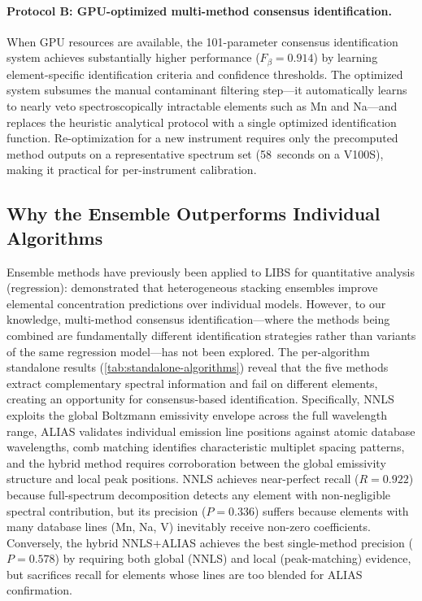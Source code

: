 \paragraph{Protocol B: GPU-optimized multi-method consensus identification.}
When GPU resources are available, the 101-parameter consensus identification system achieves substantially higher performance ($F_{\beta} = 0.914$) by learning element-specific identification criteria and confidence thresholds.
The optimized system subsumes the manual contaminant filtering step---it automatically learns to nearly veto spectroscopically intractable elements such as Mn and Na---and replaces the heuristic analytical protocol with a single optimized identification function.
Re-optimization for a new instrument requires only the precomputed method outputs on a representative spectrum set (58~seconds on a V100S), making it practical for per-instrument calibration.

\subsection{Why the Ensemble Outperforms Individual Algorithms}

Ensemble methods have previously been applied to LIBS for quantitative analysis (regression): \citet{Zeng2020} demonstrated that heterogeneous stacking ensembles improve elemental concentration predictions over individual models.
However, to our knowledge, multi-method consensus identification---where the methods being combined are fundamentally different identification strategies rather than variants of the same regression model---has not been explored.
The per-algorithm standalone results (\cref{tab:standalone-algorithms}) reveal that the five methods extract complementary spectral information and fail on different elements, creating an opportunity for consensus-based identification.
Specifically, NNLS exploits the global Boltzmann emissivity envelope across the full wavelength range, ALIAS validates individual emission line positions against atomic database wavelengths, comb matching identifies characteristic multiplet spacing patterns, and the hybrid method requires corroboration between the global emissivity structure and local peak positions.
NNLS achieves near-perfect recall ($R = 0.922$) because full-spectrum decomposition detects any element with non-negligible spectral contribution, but its precision ($P = 0.336$) suffers because elements with many database lines (Mn, Na, V) inevitably receive non-zero coefficients.
Conversely, the hybrid NNLS+ALIAS achieves the best single-method precision ($P = 0.578$) by requiring both global (NNLS) and local (peak-matching) evidence, but sacrifices recall for elements whose lines are too blended for ALIAS confirmation.

